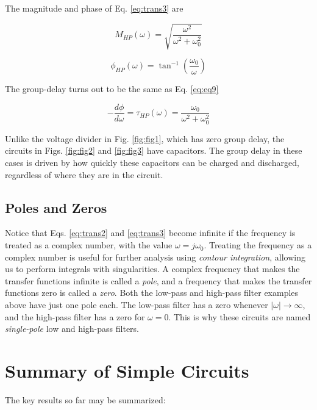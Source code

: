 \documentclass[12pt]{article}
\begin{document}
The magnitude and phase of Eq. \ref{eq:trans3} are

\begin{equation}
\boxed{
M_{HP}(\omega) = \sqrt{\frac{\omega^2}{\omega^2+\omega_0^2}}
}
\label{eq:eq11}
\end{equation}

\begin{equation}
\boxed{
\phi_{HP}(\omega) = \tan^{-1}\left(\frac{\omega_0}{\omega}\right)
}
\label{eq:eq12}
\end{equation}

The group-delay turns out to be the same as Eq. \ref{eq:eq9}

\begin{equation}
\boxed{
-\frac{d\phi}{d\omega} = \tau_{HP}(\omega) = \frac{\omega_0}{\omega^2+\omega_0^2}
}
\label{eq:eq13}
\end{equation}

Unlike the voltage divider in Fig. \ref{fig:fig1}, which has zero group delay, the circuits in Figs. \ref{fig:fig2} and \ref{fig:fig3} have capacitors.  The group delay in these cases is driven by how quickly these capacitors can be charged and discharged, regardless of where they are in the circuit.

\subsection{Poles and Zeros}

Notice that Eqs. \ref{eq:trans2} and \ref{eq:trans3} become infinite if the frequency is treated as a complex number, with the value $\omega = j\omega_0$.  Treating the frequency as a complex number is useful for further analysis using \textit{contour integration}, allowing us to perform integrals with singularities.  A complex frequency that makes the transfer functions infinite is called a \textit{pole}, and a frequency that makes the transfer functions zero is called a \textit{zero}.  Both the low-pass and high-pass filter examples above have just one pole each.  The low-pass filter has a zero whenever $|\omega| \rightarrow \infty$, and the high-pass filter has a zero for $\omega = 0$.  This is why these circuits are named \textit{single-pole} low and high-pass filters.

\section{Summary of Simple Circuits}

The key results so far may be summarized:
\end{document}
